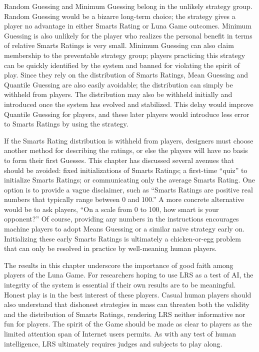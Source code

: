 Random Guessing and Minimum Guessing belong in the unlikely strategy group. Random Guessing would be a bizarre long-term choice; the strategy gives a player no advantage in either Smarts Rating or Luna Game outcomes. Minimum Guessing is also unlikely for the player who realizes the personal benefit in terms of relative Smarts Ratings is very small. Minimum Guessing can also claim membership to the preventable strategy group; players practicing this strategy can be quickly identified by the system and banned for violating the spirit of play. Since they rely on the distribution of Smarts Ratings, Mean Guessing and Quantile Guessing are also easily avoidable; the distribution can simply be withheld from players. The distribution may also be withheld initially and introduced once the system has evolved and stabilized. This delay would improve Quantile Guessing for players, and these later players would introduce less error to Smarts Ratings by using the strategy.

If the Smarts Rating distribution is withheld from players, designers must choose another method for describing the ratings, or else the players will have no basis to form their first Guesses. This chapter has discussed several avenues that should be avoided: fixed initializations of Smarts Ratings; a first-time ``quiz'' to initialize Smarts Ratings; or communicating only the average Smarts Rating. One option is to provide a vague disclaimer, such as ``Smarts Ratings are positive real numbers that typically range between 0 and 100.'' A more concrete alternative would be to ask players, ``On a scale from 0 to 100, how smart is your opponent?'' Of course, providing any numbers in the instructions encourages machine players to adopt Means Guessing or a similar naive strategy early on. Initializing these early Smarts Ratings is ultimately a chicken-or-egg problem that can only be resolved in practice by well-meaning human players.

The results in this chapter underscore the importance of good faith among players of the Luna Game. For researchers hoping to use LRS as a test of AI, the integrity of the system is essential if their own results are to be meaningful. Honest play is in the best interest of these players. Casual human players should also understand that dishonest strategies in mass can threaten both the validity and the distribution of Smarts Ratings, rendering LRS neither informative nor fun for players. The spirit of the Game should be made as clear to players as the limited attention span of Internet users permits. As with any test of human intelligence, LRS ultimately requires judges and subjects to play along.
